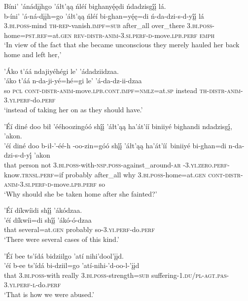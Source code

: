 \ea\label{ex:text7-14-6}
Bíni’ ’ánádįįhgo ’áłt’ąą ńléí bighanyę́ędi ńdadzisgį́į́ lá.\\
\gll b-íni’ ’á-ná-dįįh=go	’áłt’ąą	ńléí	bi-ghan=yę́ę=di	ń-da-dzi-s-d-yį́į́	lá\\
     3.\textsc{bi}.\textsc{poss}-mind \textsc{th}-\textsc{rep}-vanish.\textsc{impf}=\textsc{sub}	after\_all	over\_there	3.\textsc{bi}.\textsc{poss}-home=\textsc{pst}.\textsc{ref}=at.\textsc{gen}	\textsc{rev}-\textsc{distr}-\textsc{anim}-3.\textsc{si}.\textsc{perf}-\textsc{d}-move.\textsc{lpb}.\textsc{perf}	\textsc{emph}\\
\glt `In view of the fact that she became unconscious they merely hauled her back home and left her,'
\z

\ea\label{ex:text7-14-7}
’Áko t’áá ndajiyéhégi le’ ’ádadziidzaa.\\
\gll ’áko	t’áá	n-da-ji-yé=hé=gi	le’	’á-da-dz-ii-dzaa\\
     so	\textsc{pcl}	\textsc{cont}-\textsc{distr}-\textsc{anim}-move.\textsc{lpb}.\textsc{cont}.\textsc{impf}=\textsc{nmlz}=at.\textsc{sp}	instead	\textsc{th}-\textsc{distr}-\textsc{anim}-3.\textsc{yi}.\textsc{perf}-do.\textsc{perf}\\
\glt `instead of taking her on as they should have.'
\z

\ea\label{ex:text7-14-8}
’Éí diné doo bił ’ééhoozingóó shį́į́ ’áłt’ąą ha’át’íí biniiyé bighandi ndadzisgį́, ’akon.\\
\gll ’éí	diné	doo	b-ił-’-éé-h -oo-zin=góó	shį́į́	’áłt’ąą	ha’át’íí~{biniiyé}	bi-ghan=di	n-da-dzi-s-d-yį́	’akon\\
     that	person	not	3.\textsc{bi}.\textsc{poss}-with-\textsc{nsp}.\textsc{poss}-against\_around-\textsc{ar} -3.\textsc{yi}.\textsc{zero}.\textsc{perf}-know.\textsc{trnsl}.\textsc{perf}=if	probably	after\_all	why	3.\textsc{bi}.\textsc{poss}-home=at.\textsc{gen}	\textsc{cont}-\textsc{distr}-\textsc{anim}-3.\textsc{si}.\textsc{perf}-\textsc{d}-move.\textsc{lpb}.\textsc{perf}	so\\
\glt `Why should she be taken home after she fainted?'
\z

\ea\label{ex:text7-14-9}
’Éí díkwíidi shį́į́ ’ákódzaa.\\
\gll ’éí	díkwíi=di	shį́į́	’ákó-ó-dzaa\\
     that	several=at.\textsc{gen}	probably	so-3.\textsc{yi}.\textsc{perf}-do.\textsc{perf}\\
\glt `There were several cases of this kind.'
\z

\ea\label{ex:text7-14-10}
’Éí bee ts’ídá bidziilgo ’atí nihi’dool’įįd.\\
\gll ’éí	b-ee	ts’ídá	bi-dziil=go	’atí-nihi-’d-oo-l-’įįd\\
     that	3.\textsc{bi}.\textsc{poss}-with	really	3.\textsc{bi}.\textsc{poss}-strength=\textsc{sub}	suffering-1.\textsc{du}/\textsc{pl}-\textsc{agt}.\textsc{pas}-3.\textsc{yi}.\textsc{perf}-\textsc{l}-do.\textsc{perf}\\
\glt `That is how we were abused.'
\z

